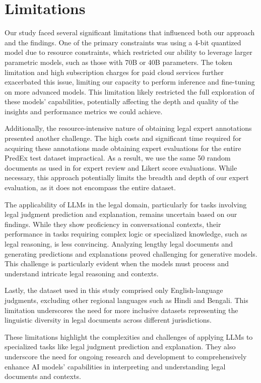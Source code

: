 \section*{Limitations}
Our study faced several significant limitations that influenced both our approach and the findings. One of the primary constraints was using a 4-bit quantized model due to resource constraints, which restricted our ability to leverage larger parametric models, such as those with 70B or 40B parameters. The token limitation and high subscription charges for paid cloud services further exacerbated this issue, limiting our capacity to perform inference and fine-tuning on more advanced models. This limitation likely restricted the full exploration of these models' capabilities, potentially affecting the depth and quality of the insights and performance metrics we could achieve.

Additionally, the resource-intensive nature of obtaining legal expert annotations presented another challenge. The high costs and significant time required for acquiring these annotations made obtaining expert evaluations for the entire PredEx test dataset impractical. As a result, we use the same 50 random documents as used in \cite{nigam2024legaljudgmentreimaginedpredex} for expert review and Likert score evaluations. While necessary, this approach potentially limits the breadth and depth of our expert evaluation, as it does not encompass the entire dataset.

The applicability of LLMs in the legal domain, particularly for tasks involving legal judgment prediction and explanation, remains uncertain based on our findings. While they show proficiency in conversational contexts, their performance in tasks requiring complex logic or specialized knowledge, such as legal reasoning, is less convincing. Analyzing lengthy legal documents and generating predictions and explanations proved challenging for generative models. This challenge is particularly evident when the models must process and understand intricate legal reasoning and contexts.

Lastly, the dataset used in this study comprised only English-language judgments, excluding other regional languages such as Hindi and Bengali. This limitation underscores the need for more inclusive datasets representing the linguistic diversity in legal documents across different jurisdictions.

These limitations highlight the complexities and challenges of applying LLMs to specialized tasks like legal judgment prediction and explanation. They also underscore the need for ongoing research and development to comprehensively enhance AI models' capabilities in interpreting and understanding legal documents and contexts.
